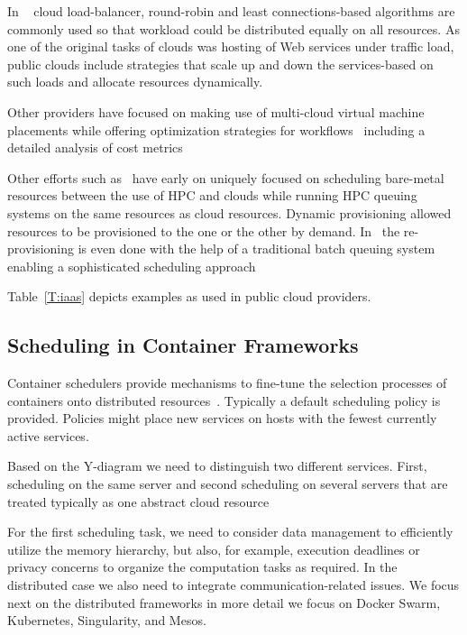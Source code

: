 \documentclass[final,5p,times,twocolumn]{elsarticle}
\begin{document}
In ~\cite{Rackspace2016} cloud load-balancer, round-robin and least connections-based algorithms are commonly used so that workload could be distributed equally on all resources. As one of the original tasks of clouds was hosting of Web services under traffic load, public clouds include strategies that scale up and down the services-based on such loads and allocate resources dynamically.

Other providers have focused on making use of multi-cloud virtual machine placements while offering optimization strategies for workflows~\cite{CloudSigma2016} including a detailed analysis of cost metrics~\cite{Cloudmetrics2019}

Other efforts such as~\cite{las12fg-bookchapter} have early on uniquely focused on scheduling bare-metal resources between the use of HPC and clouds while running HPC queuing systems on the same resources as cloud resources. Dynamic provisioning allowed resources to be provisioned to the one or the other by demand. In~\cite{las-comet} the re-provisioning is even done with the help of a traditional batch queuing system enabling a sophisticated scheduling approach

Table~\ref{T:iaas} depicts examples as used in public cloud providers.



%


\subsection{Scheduling in Container Frameworks}
\label{sec:container}


Container schedulers provide mechanisms to fine-tune the selection processes of containers onto distributed resources~\cite{Containers2018,de2018distributed}. Typically a default scheduling policy is provided. Policies might place new services on hosts with the fewest currently active services.

Based on the Y-diagram we need to distinguish two different services. First, scheduling on the same server and second scheduling on several servers that are treated typically as one abstract cloud resource

For the first scheduling task, we need to consider data management to efficiently utilize the memory hierarchy, but also, for example, execution deadlines or privacy concerns to organize the computation tasks as required. In the distributed case we also need to integrate communication-related issues. We focus next on the distributed frameworks in more detail we focus on Docker Swarm, Kubernetes, Singularity, and Mesos.
\end{document}

